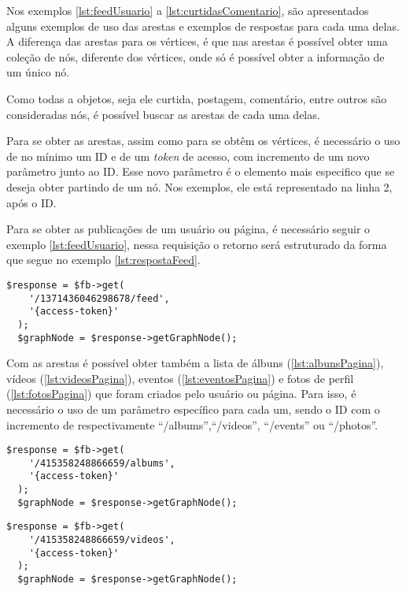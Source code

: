 Nos exemplos \ref{lst:feedUsuario} a \ref{lst:curtidasComentario}, são apresentados alguns exemplos de uso das arestas e exemplos de respostas para cada uma delas. A diferença das arestas para os vértices, é que nas arestas é possível obter uma coleção de nós, diferente dos vértices, onde só é possível obter a informação de um único nó.

Como todas a objetos, seja ele curtida, postagem, comentário, entre outros são consideradas nós, é possível buscar as arestas de cada uma delas.

Para se obter as arestas, assim como para se obtêm os vértices, é necessário o uso de no mínimo um ID e de um \textit{token} de acesso, com incremento de um novo parâmetro junto ao ID. Esse novo parâmetro é o elemento mais especifico que se deseja obter partindo de um nó. Nos exemplos, ele está representado na linha 2, após o ID.

Para se obter as publicações de um usuário ou página, é necessário seguir o exemplo \ref{lst:feedUsuario}, nessa requisição o retorno será estruturado da forma que segue no exemplo \ref{lst:respostaFeed}.

\begin{lstlisting}[caption={Requisitando todas as publicações de um usuário},label={lst:feedUsuario}]
  $response = $fb->get( 
    '/1371436046298678/feed', 
    '{access-token}'
  );
  $graphNode = $response->getGraphNode();
\end{lstlisting}

Com as arestas é possível obter também a lista de álbuns (\ref{lst:albunsPagina}), vídeos (\ref{lst:videosPagina}), eventos (\ref{lst:eventosPagina}) e fotos de perfil (\ref{lst:fotosPagina}) que foram criados pelo usuário ou página. Para isso, é necessário o uso de um parâmetro específico para cada um, sendo o ID com o incremento de respectivamente ``/albums'',``/videos'', ``/events'' ou ``/photos''.
\begin{lstlisting}[caption={Requisitar todos os álbuns de uma página},label={lst:albunsPagina}]
  $response = $fb->get( 
    '/415358248866659/albums', 
    '{access-token}'
  );
  $graphNode = $response->getGraphNode();
\end{lstlisting}

\begin{lstlisting}[caption={Requisitar os vídeos publicados na página},label={lst:videosPagina}]
  $response = $fb->get( 
    '/415358248866659/videos', 
    '{access-token}'
  );
  $graphNode = $response->getGraphNode();
\end{lstlisting}

